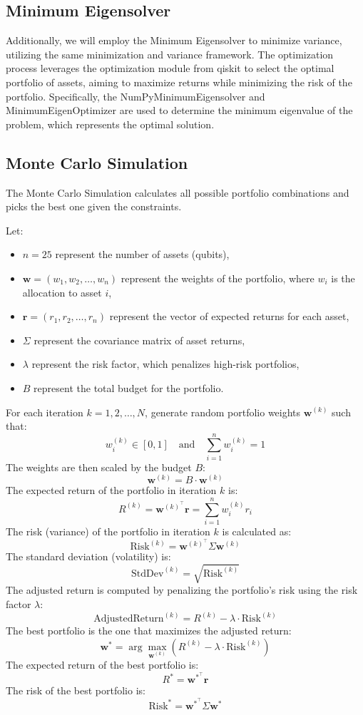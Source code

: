 \documentclass[%
 reprint,
 amsmath,amssymb,
 aps,
]{revtex4-2}
\begin{document}
\subsection{Minimum Eigensolver}

Additionally, we will employ the Minimum Eigensolver to minimize variance, utilizing the same minimization and variance framework. The optimization process leverages the optimization module from qiskit to select the optimal portfolio of assets, aiming to maximize returns while minimizing the risk of the portfolio. Specifically, the NumPyMinimumEigensolver and MinimumEigenOptimizer are used to determine the minimum eigenvalue of the problem, which represents the optimal solution.


\subsection{Monte Carlo Simulation}
The Monte Carlo Simulation calculates all possible portfolio combinations and picks the best one given the constraints.

Let:
\begin{itemize}
    \item \( n = 25 \) represent the number of assets (qubits),
    \item \( \mathbf{w} = (w_1, w_2, \dots, w_n) \) represent the weights of the portfolio, where \( w_i \) is the allocation to asset \( i \),
    \item \( \mathbf{r} = (r_1, r_2, \dots, r_n) \) represent the vector of expected returns for each asset,
    \item \( \Sigma \) represent the covariance matrix of asset returns,
    \item \( \lambda \) represent the risk factor, which penalizes high-risk portfolios,
    \item \( B \) represent the total budget for the portfolio.
\end{itemize}

For each iteration \( k = 1, 2, \dots, N \), generate random portfolio weights \( \mathbf{w}^{(k)} \) such that:
\[
w_i^{(k)} \in [0, 1] \quad \text{and} \quad \sum_{i=1}^{n} w_i^{(k)} = 1
\]
The weights are then scaled by the budget \( B \):
\[
\mathbf{w}^{(k)} = B \cdot \mathbf{w}^{(k)}
\]
The expected return of the portfolio in iteration \( k \) is:
\[
R^{(k)} = \mathbf{w}^{(k)^\top} \mathbf{r} = \sum_{i=1}^{n} w_i^{(k)} r_i
\]
The risk (variance) of the portfolio in iteration \( k \) is calculated as:
\[
\text{Risk}^{(k)} = \mathbf{w}^{(k)^\top} \Sigma \mathbf{w}^{(k)}
\]
The standard deviation (volatility) is:
\[
\text{StdDev}^{(k)} = \sqrt{\text{Risk}^{(k)}}
\]
The adjusted return is computed by penalizing the portfolio's risk using the risk factor \( \lambda \):
\[
\text{AdjustedReturn}^{(k)} = R^{(k)} - \lambda \cdot \text{Risk}^{(k)}
\]
The best portfolio is the one that maximizes the adjusted return:
\[
\mathbf{w}^* = \arg \max_{\mathbf{w}^{(k)}} \left( R^{(k)} - \lambda \cdot \text{Risk}^{(k)} \right)
\]
The expected return of the best portfolio is:
\[
R^* = \mathbf{w}^{*^\top} \mathbf{r}
\]
The risk of the best portfolio is:
\[
\text{Risk}^* = \mathbf{w}^{*^\top} \Sigma \mathbf{w}^*
\]
\end{document}
